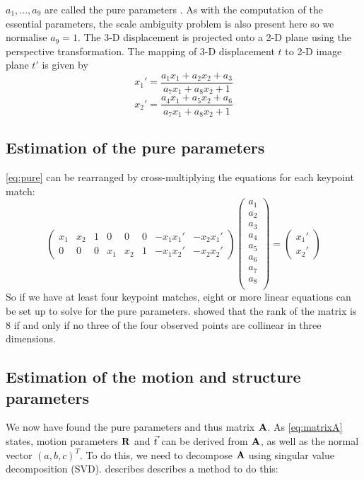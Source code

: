 $a_1,...,a_9$ are called the pure parameters \cite{506592e3b5484e57928e215df49a83cb}. As with the computation of the essential parameters, the scale ambiguity problem is also present here so we normalise $a_9 = 1$. The 3-D displacement is projected onto a 2-D plane using the perspective transformation. The mapping of 3-D displacement $t$ to 2-D image plane $t'$ is given by 
\begin{equation*}
    x_1' = \frac{a_1x_1 + a_2x_2 + a_3}{a_7x_1 + a_8x_2 + 1}
\end{equation*}
\begin{equation}\label{eq:pure}
     x_2' = \frac{a_4x_1 + a_5x_2 + a_6}{a_7x_1 + a_8x_2 + 1}
\end{equation}

\subsection{Estimation of the pure parameters}
\autoref{eq:pure} can be rearranged by cross-multiplying the equations for each keypoint match:
\begin{equation}
    \begin{pmatrix}
        x_1 & x_2 & 1 & 0 & 0 & 0 & -x_1x_1' & -x_2x_1' \\
        0 & 0 & 0 & x_1 & x_2 & 1 & -x_1x_2' & -x_2x_2'
    \end{pmatrix}
    \begin{pmatrix}
        a_1 \\ a_2 \\ a_3 \\ a_4 \\ a_5 \\ a_6 \\ a_7 \\ a_8 \\
    \end{pmatrix} = 
    \begin{pmatrix}
        x_1' \\ x_2'
    \end{pmatrix}
\end{equation}
So if we have at least four keypoint matches, eight or more linear equations can be set up to solve for the pure parameters. \cite{improc} showed that the rank of the matrix is 8 if and only if no three of the four observed points are collinear in three dimensions.

\subsection{Estimation of the motion and structure parameters}
We now have found the pure parameters and thus matrix $\mathbf{A}$. As \autoref{eq:matrixA} states, motion parameters $\mathbf{R}$ and $\vec t$ can be derived from $\mathbf{A}$, as well as the normal vector $(a,b,c)^T$. To do this, we need to decompose $\mathbf{A}$ using singular value decomposition (SVD). \cite{Huang:86} describes describes a method to do this:

